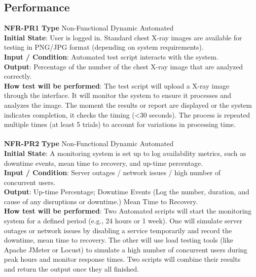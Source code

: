 \documentclass[12pt, titlepage]{article}
\begin{document}
\subsection{Performance}
\noindent \textbf{NFR-PR1} \textbf{Type} Non-Functional Dynamic Automated \\
        \indent \textbf{Initial State}: User is logged in. Standard chest X-ray images are available for testing in PNG/JPG format (depending on system requirements). \\
        \indent \textbf{Input / Condition}: Automated test script interacts with the system.\\
        \indent \textbf{Output}: Percentage of the number of the chest X-ray image that are analyzed correctly.\\
        \indent \textbf{How test will be performed}: The test script will upload a X-ray image through the interface. It will monitor the system to ensure it processes and analyzes the image. The moment the results or report are displayed or the system indicates completion, it checks the timing (<30 seconds). The process is repeated multiple times (at least 5 trials) to account for variations in processing time. \\
\\
\textbf{NFR-PR2} \textbf{Type} Non-Functional Dynamic Automated \\
        \indent \textbf{Initial State}: A monitoring system is set up to log availability metrics, such as downtime events, mean time to recovery, and up-time percentage.\\
        \indent \textbf{Input / Condition}: Server outages / network issues / high number of concurrent users.\\
        \indent \textbf{Output}: Up-time Percentage; Downtime Events (Log the number, duration, and cause of any disruptions or downtime.) Mean Time to Recovery.\\
        \indent \textbf{How test will be performed}: Two Automated scripts will start the monitoring system for a defined period (e.g., 24 hours or 1 week). One will simulate server outages or network issues by disabling a service temporarily and record the downtime, mean time to recovery. The other will use load testing tools (like Apache JMeter or Locust) to simulate a high number of concurrent users during peak hours and monitor response times. Two scripts will combine their results and return the output once they all finished.\\
\\
\end{document}
